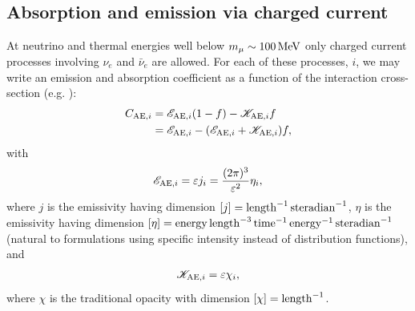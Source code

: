 \documentclass[aps,floatfix,prd,superscriptaddress,twocolumn]{revtex4-1}
\newcommand{\todo}[1]{\marginpar{\tiny{\textcolor{red}{#1}}}}
\begin{document}
\subsection{Absorption and emission via charged current}
\label{ssec:sources_ae}
At neutrino and thermal energies well below $m_{\mu}\sim100\,{\rm MeV}$
only charged current processes involving $\nu_e$ and $\bar{\nu}_e$ are allowed.
For each of these processes, $i$, we may write an emission and absorption
coefficient as a function of the interaction cross-section
(e.g. \cite[Eqn.~A5]{brue1985-core_collapse}):
\todo{explain Fermi-blocking}
\begin{align}
  \label{eqn:sources_ae_1}
  C_{{\rm AE},i}
  &= \mathscr{E}_{{\rm AE},i} (1-f) - \mathscr{K}_{{\rm AE},i} f \\
  \label{eqn:sources_ae_2}
  &= \mathscr{E}_{{\rm AE},i} - (\mathscr{E}_{{\rm AE},i} + \mathscr{K}_{{\rm AE},i}) f,
\end{align}
with
\begin{equation}
  \label{eqn:inv_emissivity}
  \mathscr{E}_{{\rm AE},i}
  = \varepsilon j_i
  = \frac{(2\pi)^3}{\varepsilon^2}\eta_i,
\end{equation}
where $j$ is the emissivity having dimension
$[j]={\rm length}^{-1}\,{\rm steradian}^{-1}$,
$\eta$ is the emissivity having dimension
$[\eta]={\rm energy}\,{\rm length}^{-3}\,{\rm time}^{-1}\,{\rm energy}^{-1}\,{\rm steradian}^{-1}$
(natural to formulations using specific intensity instead of distribution
functions), and
\begin{equation}
  \label{eqn:inv_opacity}
  \mathscr{K}_{{\rm AE},i} = \varepsilon \chi_i,
\end{equation}
where $\chi$ is the traditional opacity with dimension
$[\chi]={\rm length}^{-1}$.
\end{document}
